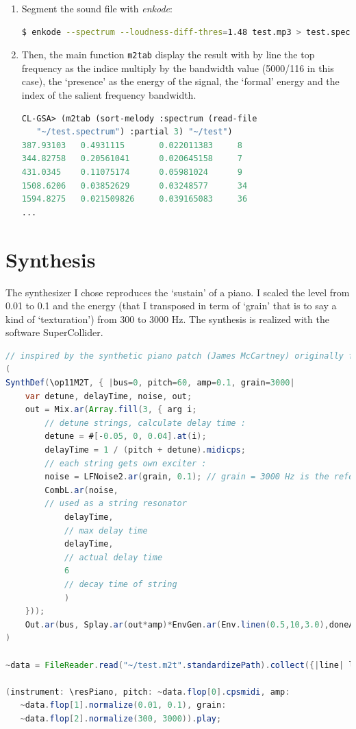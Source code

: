 \begin{enumerate}
\item
Segment the sound file with \textsl{enkode}:
\begin{lstlisting}[language=bash]
$ enkode --spectrum --loudness-diff-thres=1.48 test.mp3 > test.spectrum
\end{lstlisting}

\item
Then, the main function \texttt{m2tab} display the result with by line the top frequency as the indice multiply by the bandwidth value (5000/116 in this case), the `presence' as the energy of the signal, the `formal' energy and the index of the salient frequency bandwidth.   
\begin{lstlisting}[language=Lisp]
CL-GSA> (m2tab (sort-melody :spectrum (read-file 
   "~/test.spectrum") :partial 3) "~/test")
387.93103   0.4931115       0.022011383     8
344.82758   0.20561041      0.020645158     7
431.0345    0.11075174      0.05981024      9
1508.6206   0.03852629      0.03248577      34
1594.8275   0.021509826     0.039165083     36
...
\end{lstlisting}
\end{enumerate}

\section{Synthesis}

The synthesizer I chose reproduces the `sustain' of a piano. I scaled the level from 0.01 to 0.1 and the energy (that I transposed in term of `grain' that is to say a kind of `texturation') from 300 to 3000 Hz. The synthesis is realized with the software SuperCollider.
\newpage
\begin{lstlisting}[language=Java]
// inspired by the synthetic piano patch (James McCartney) originally for SC2, 1998.
(
SynthDef(\op11M2T, { |bus=0, pitch=60, amp=0.1, grain=3000|
	var detune, delayTime, noise, out;
	out = Mix.ar(Array.fill(3, { arg i;
		// detune strings, calculate delay time :
		detune = #[-0.05, 0, 0.04].at(i);
		delayTime = 1 / (pitch + detune).midicps;
		// each string gets own exciter :
		noise = LFNoise2.ar(grain, 0.1); // grain = 3000 Hz is the reference
		CombL.ar(noise,		
		// used as a string resonator
			delayTime, 	
			// max delay time
			delayTime,	
			// actual delay time
			6
			// decay time of string
			)
	}));
	Out.ar(bus, Splay.ar(out*amp)*EnvGen.ar(Env.linen(0.5,10,3.0),doneAction:2))}).add
)

~data = FileReader.read("~/test.m2t".standardizePath).collect({|line| line.collect({|val| val.asFloat})}) 
 
(instrument: \resPiano, pitch: ~data.flop[0].cpsmidi, amp:
   ~data.flop[1].normalize(0.01, 0.1), grain: 
   ~data.flop[2].normalize(300, 3000)).play;
\end{lstlisting}

